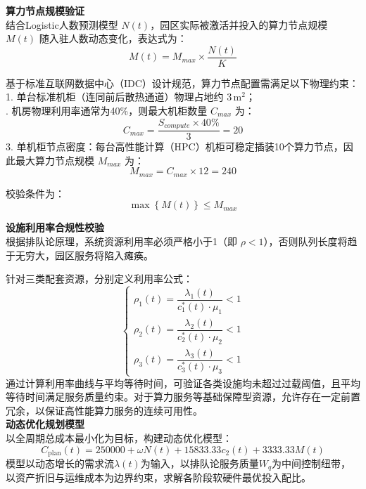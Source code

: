 \documentclass[12pt,a4paper]{article}
\begin{document}
\textbf{算力节点规模验证}\\
结合Logistic人数预测模型 $N(t)$，园区实际被激活并投入的算力节点规模 $M(t)$ 随入驻人数动态变化，表达式为：
\begin{equation}
M(t) = M_{max} \times \frac{N(t)}{K}
\end{equation}

基于标准互联网数据中心（IDC）设计规范，算力节点配置需满足以下物理约束：
1.  单台标准机柜（连同前后散热通道）物理占地约 $3\,\text{m}^2$；\\
.  机房物理利用率通常为40\%，则最大机柜数量 $C_{max}$ 为：
    \begin{equation}
    C_{max} = \frac{S_{compute} \times 40\%}{3} = 20
    \end{equation}
3.  单机柜节点密度：每台高性能计算（HPC）机柜可稳定插装10个算力节点，因此最大算力节点规模 $M_{max}$ 为：
    \begin{equation}
    M_{max} = C_{max} \times 12 = 240
    \end{equation}

校验条件为：
\begin{equation}
\max\left\{ M(t) \right\} \leq M_{max}
\end{equation}

\textbf{设施利用率合规性校验}\\
根据排队论原理，系统资源利用率必须严格小于1（即 $\rho < 1$），否则队列长度将趋于无穷大，园区服务将陷入瘫痪。

针对三类配套资源，分别定义利用率公式：
\begin{equation}
\begin{cases}
\rho_1(t) = \dfrac{\lambda_1(t)}{c_1^*(t) \cdot \mu_1} < 1 \\[6pt]
\rho_2(t) = \dfrac{\lambda_2(t)}{c_2^*(t) \cdot \mu_2} < 1 \\[6pt]
\rho_3(t) = \dfrac{\lambda_3(t)}{c_3^*(t) \cdot \mu_3} < 1
\end{cases}
\end{equation}
\vspace{1em}
通过计算利用率曲线与平均等待时间，可验证各类设施均未超过过载阈值，且平均等待时间满足服务质量约束。对于算力服务等基础保障型资源，允许存在一定前置冗余，以保证高性能算力服务的连续可用性。\\
\indent\textbf{动态优化规划模型}\\
以全周期总成本最小化为目标，构建动态优化模型：
\begin{equation}
C_{\mathrm{plan}}(t)=250000+\omega N(t)+15833.33c_2(t)+3333.33M(t)
\end{equation}
模型以动态增长的需求流$\lambda(t)$为输入，以排队论服务质量$W_q$为中间控制纽带，以资产折旧与运维成本为边界约束，求解各阶段软硬件最优投入配比。
\end{document}
